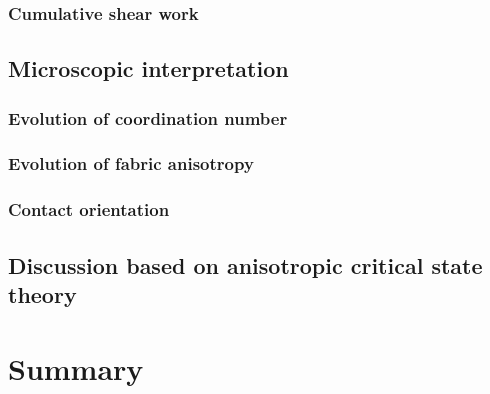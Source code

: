 \documentclass[../main]{subfiles}
\begin{document}
\subsubsection{Cumulative shear work}

\subsection{Microscopic interpretation}
\label{subsec:ch5_micro}

\subsubsection{Evolution of coordination number}

\subsubsection{Evolution of fabric anisotropy}

\subsubsection{Contact orientation}

\subsection{Discussion based on anisotropic critical state theory}
\label{subsec:ch5_acst}

\section{Summary}
\label{sec:ch5_summary}
\end{document}
